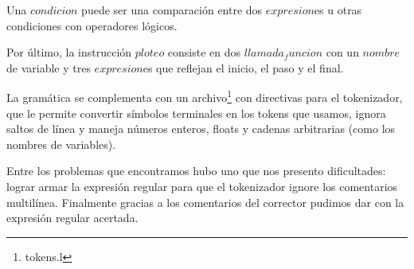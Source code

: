 Una $condicion$ puede ser una comparación entre dos $expresion$es u otras condiciones con operadores lógicos.

Por último, la instrucción $ploteo$ consiste en dos $llamada_funcion$ con un $nombre$ de variable y tres $expresion$es que reflejan el inicio, el paso y el final.

La gramática se complementa con un archivo\footnote{tokens.l} con directivas para el tokenizador, que le permite convertir símbolos terminales en los tokens que usamos, ignora saltos de línea y maneja números enteros, floats y cadenas arbitrarias (como los nombres de variables).

Entre los problemas que encontramos hubo uno que nos presento dificultades: lograr armar la expresión regular para que el tokenizador ignore los comentarios multilínea. Finalmente gracias a los comentarios del corrector pudimos dar con la expresión regular acertada.